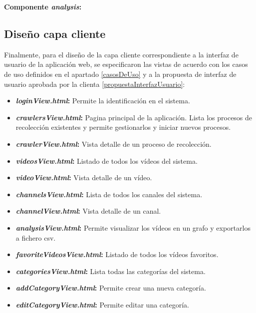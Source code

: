 \documentclass[11pt,a4paper]{article}
\begin{document}
\noindent\textbf{Componente \textit{analysis}:}
\begin{table}[H]
\centering
{}
\caption{Componente \textit{analysis} API}
\end{table}

\medskip 

\subsection{Diseño capa cliente}\label{capaCliente} 
Finalmente, para el diseño de la capa cliente correspondiente a la interfaz de usuario de la aplicación web, se especificaron las vistas de acuerdo con los casos de uso definidos en el apartado \ref{casosDeUso} y a la propuesta de interfaz de usuario aprobada por la clienta \ref{propuestaInterfazUsuario}:
\\

\begin{itemize}
\item \textbf{\textit{loginView.html}:} Permite la identificación en el sistema.
\item \textbf{\textit{crawlersView.html}:} Pagina principal de la aplicación. Lista los procesos de recolección existentes y permite gestionarlos y iniciar nuevos procesos.
\item \textbf{\textit{crawlerView.html}:} Vista detalle de un proceso de recolección.
\item \textbf{\textit{videosView.html}:} Listado de todos los vídeos del sistema.
\item \textbf{\textit{videoView.html}:} Vista detalle de un vídeo.
\item \textbf{\textit{channelsView.html}:} Lista de todos los canales del sistema.
\item \textbf{\textit{channelView.html}:} Vista detalle de un canal.
\item \textbf{\textit{analysisView.html}:} Permite visualizar los vídeos en un grafo y exportarlos a fichero csv.
\item \textbf{\textit{favoriteVideosView.html}:} Listado de todos los vídeos favoritos.
\item \textbf{\textit{categoriesView.html}:} Lista todas las categorías del sistema.
\item \textbf{\textit{addCategoryView.html}:} Permite crear una nueva categoría.
\item \textbf{\textit{editCategoryView.html}:} Permite editar una categoría.
\end{itemize}
\end{document}
